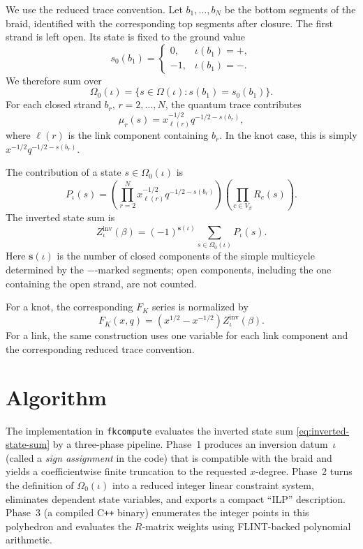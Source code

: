 \documentclass[twocolumn]{article}
\begin{document}
We use the reduced trace convention.  Let \(b_1,\ldots,b_N\) be the bottom
segments of the braid, identified with the corresponding top segments after
closure.  The first strand is left open.  Its state is fixed to the ground value
\[
  s_0(b_1)=
  \begin{cases}
  0, & \iota(b_1)=+,\\
  -1,& \iota(b_1)=-.
  \end{cases}
\]
We therefore sum over
\[
  \Omega_0(\iota)=\{s\in\Omega(\iota):s(b_1)=s_0(b_1)\}.
\]
For each closed strand \(b_r\), \(r=2,\ldots,N\), the quantum trace contributes
\[
  \mu_r(s)=x_{\ell(r)}^{-1/2}q^{-1/2-s(b_r)},
\]
where \(\ell(r)\) is the link component containing \(b_r\).  In the knot case,
this is simply \(x^{-1/2}q^{-1/2-s(b_r)}\).

The contribution of a state \(s\in\Omega_0(\iota)\) is
\begin{equation}\label{eq:state-contribution}
  P_\iota(s)
  =
  \left(\prod_{r=2}^{N} x_{\ell(r)}^{-1/2}q^{-1/2-s(b_r)}\right)
  \left(\prod_{c\in V_\beta} R_c(s)\right).
\end{equation}
The inverted state sum is
\begin{equation}\label{eq:inverted-state-sum}
  Z^{\mathrm{inv}}_\iota(\beta)
  =
  (-1)^{\mathbf{s}(\iota)}
  \sum_{s\in\Omega_0(\iota)} P_\iota(s).
\end{equation}
Here \(\mathbf{s}(\iota)\) is the number of closed components of the simple
multicycle determined by the \(-\)-marked segments; open components, including
the one containing the open strand, are not counted.

For a knot, the corresponding \(F_K\) series is normalized by
\begin{equation}\label{eq:FK-from-Zinv}
  F_K(x,q)=(x^{1/2}-x^{-1/2})Z^{\mathrm{inv}}_\iota(\beta).
\end{equation}
For a link, the same construction uses one variable for each link component and
the corresponding reduced trace convention.


  \section{Algorithm}

The implementation in \texttt{fkcompute} evaluates the inverted state sum
\eqref{eq:inverted-state-sum} by a three-phase pipeline.
Phase~1 produces an inversion datum~$\iota$ (called a \emph{sign assignment} in
the code) that is compatible with the braid and yields a coefficientwise finite
truncation to the requested $x$-degree.
Phase~2 turns the definition of $\Omega_0(\iota)$ into a reduced integer linear
constraint system, eliminates dependent state variables, and exports a compact
``ILP'' description.
Phase~3 (a compiled C\texttt{++} binary) enumerates the integer points in this
polyhedron and evaluates the $R$-matrix weights using FLINT-backed polynomial
arithmetic.
\end{document}
